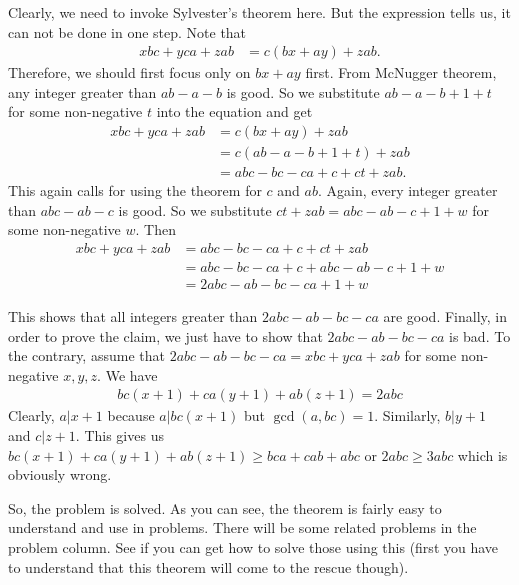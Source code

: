 \documentclass{subfile}
\begin{document}
	\begin{solution}
		Clearly, we need to invoke Sylvester's theorem here. But the expression tells us, it can not be done in one step. Note that
			\begin{align*}
				xbc+yca+zab & = c(bx+ay)+zab.
			\end{align*}
		Therefore, we should first focus only on $bx+ay$ first. From McNugger theorem, any integer greater than $ab-a-b$ is good. So we substitute $ab-a-b+1+t$ for some non-negative $t$ into the equation and get
			\begin{align*}
				xbc+yca+zab & = c(bx+ay)+zab\\
							& = c(ab-a-b+1+t)+zab\\
							& = abc-bc-ca+c+ct+zab.
			\end{align*}
		This again calls for using the theorem for $c$ and $ab$. Again, every integer greater than $abc-ab-c$ is good. So we substitute $ct+zab=abc-ab-c+1+w$ for some non-negative $w$. Then
			\begin{align*}
				xbc+yca+zab & = abc-bc-ca+c+ct+zab\\
							& = abc-bc-ca+c+abc-ab-c+1+w\\
							& = 2abc-ab-bc-ca+1+w
			\end{align*}
	\end{solution}
This shows that all integers greater than $2abc-ab-bc-ca$ are good.	Finally, in order to prove the claim, we just have to show that $2abc-ab-bc-ca$ is bad. To the contrary, assume that $2abc-ab-bc-ca=xbc+yca+zab$ for some non-negative $x,y,z$. We have
	\begin{align*}
		bc(x+1)+ca(y+1)+ab(z+1)=2abc
	\end{align*}
Clearly, $a|x+1$ because $a|bc(x+1)$ but $\gcd(a,bc)=1$. Similarly, $b|y+1$ and $c|z+1$. This gives us $bc(x+1)+ca(y+1)+ab(z+1)\geq bca+cab+abc$ or $2abc\geq3abc$ which is obviously wrong.

So, the problem is solved. As you can see, the theorem is fairly easy to understand and use in problems. There will be some related problems in the problem column. See if you can get how to solve those using this (first you have to understand that this theorem will come to the rescue though).
\end{document}
